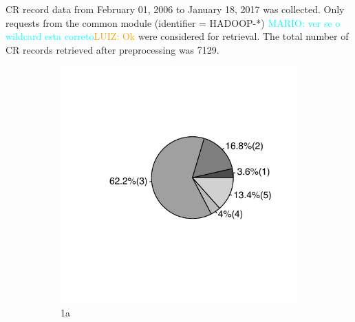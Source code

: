 \documentclass[10pt, conference]{IEEEtran}
\newcommand{\luiz}[1]{\noindent\textcolor{orange}{LUIZ: {#1}}}
\newcommand{\mario}[1]{\noindent\textcolor{cyan}{MARIO: {#1}}}
\newcommand{\luiz}[1]{}
\newcommand{\mario}[1]{}
\begin{document}
CR record data from February 01, 2006 to January 18, 2017 was collected.  Only requests from the common module (identifier = HADOOP-*) \mario{ver se o wildcard esta correto}\luiz{Ok} were considered for retrieval. The total number of CR records retrieved after preprocessing was 7129. 




\begin{figure}[!hbt]
\begin{subfigure}{.5\textwidth}
  \centering
  \includegraphics{figures/ds_distribution_1.pdf}
  \caption{1a}
  \label{fig:sfig1}
\end{subfigure}%
\begin{subfigure}{.5\textwidth}
  \centering

\end{subfigure}
\end{figure}
\end{document}
